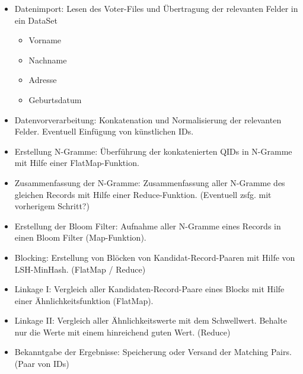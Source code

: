 \documentclass[10pt]{article}
\begin{document}
		\begin{itemize}
			\item Datenimport: Lesen des Voter-Files und Übertragung der relevanten Felder in
			 ein DataSet
			\begin{itemize}
				\item Vorname
				\item Nachname
				\item Adresse
				\item Geburtsdatum
			\end{itemize}
			\item Datenvorverarbeitung: Konkatenation und Normalisierung der relevanten
			 Felder. Eventuell Einfügung von künstlichen IDs.
			\item Erstellung N-Gramme: Überführung der konkatenierten QIDs in N-Gramme mit
			 Hilfe einer FlatMap-Funktion.
			\item Zusammenfassung der N-Gramme: Zusammenfassung aller N-Gramme des
			 gleichen Records mit Hilfe einer Reduce-Funktion. (Eventuell zsfg. mit vorherigem
			  Schritt?)
			\item Erstellung der Bloom Filter: Aufnahme aller N-Gramme eines Records in einen
			 Bloom Filter (Map-Funktion).
		\end{itemize}

 		\begin{itemize}
        		\item Blocking: Erstellung von Blöcken von Kandidat-Record-Paaren mit Hilfe von
        		 LSH-MinHash. (FlatMap / Reduce)
			\item Linkage I: Vergleich aller Kandidaten-Record-Paare eines Blocks mit Hilfe einer
			 Ähnlichkeitsfunktion (FlatMap).
			\item Linkage II: Vergleich aller Ähnlichkeitswerte mit dem Schwellwert. Behalte nur
			 die Werte mit einem hinreichend guten Wert. (Reduce)
			\item Bekanntgabe der Ergebnisse: Speicherung oder Versand der Matching Pairs.
			 (Paar von IDs)
		\end{itemize}



\end{document}
